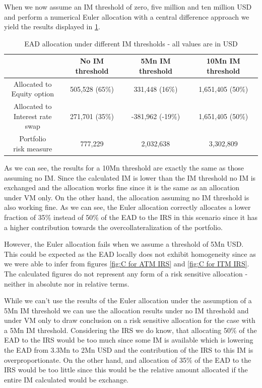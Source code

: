 \documentclass[../Thesis_AHoecherl.tex]{subfiles}
\begin{document}
    When we now assume an \gls{IM} threshold of zero, five million and ten million USD and perform a numerical Euler allocation with a central difference approach we yield the results displayed in \ref{tab:IM threshold example allocated}.
    \begin{table}[htbp]
        \centering
        \begin{tabular}{c||c|c|c}
            & No \gls{IM} threshold & 5Mn \gls{IM} threshold & 10Mn \gls{IM} threshold \\
            \toprule
            \makecell{Allocated to \\ Equity option} & 505,528 (65\%) & 331,448 (16\%) & 1,651,405 (50\%) \\
            \midrule
            \makecell{Allocated to \\ Interest rate swap}& 271,701 (35\%) & -381,962 (-19\%) & 1,651,405 (50\%) \\
            \bottomrule
            \makecell{Portfolio \\ risk measure} & 777,229 & 2,032,638 & 3,302,809 \\
        \end{tabular}%
        \caption[EAD allocation under different IM thresholds]{EAD allocation under different IM thresholds - all values are in USD}
        \label{tab:IM threshold example allocated}
    \end{table}
    As we can see, the results for a 10Mn threshold are exactly the same as those assuming no IM. Since the calculated \gls{IM} is lower than the \gls{IM} threshold no \gls{IM} is exchanged and the allocation works fine since it is the same as an allocation under \gls{VM} only.
    On the other hand, the allocation assuming no \gls{IM} threshold is also working fine. As we can see, the Euler allocation correctly allocates a lower fraction of 35\% instead of 50\% of the \gls{EAD} to the \gls{IRS} in this scenario since it has a higher contribution towards the overcollateralization of the portfolio.

    However, the Euler allocation fails when we assume a threshold of 5Mn USD. This could be expected as the \gls{EAD} locally does not exhibit homogeneity since as we were able to infer from figures \ref{fig:C for ATM IRS} and \ref{fig:C for ITM IRS}. The calculated figures do not represent any form of a risk sensitive allocation - neither in absolute nor in relative terms.

    While we can't use the results of the Euler allocation under the assumption of a 5Mn \gls{IM} threshold we can use the allocation results under no \gls{IM} threshold and under \gls{VM} only to draw conclusion on a risk sensitive allocation for the case with a 5Mn \gls{IM} threshold.
    Considering the \gls{IRS} we do know, that allocating 50\% of the \gls{EAD} to the \gls{IRS} would be too much since some \gls{IM} is available which is lowering the \gls{EAD} from 3.3Mn to 2Mn USD and the contribution of the \gls{IRS} to this \gls{IM} is overproportionate. On the other hand, and allocation of 35\% of the \gls{EAD} to the \gls{IRS} would be too little since this would be the relative amount allocated if the entire \gls{IM} calculated would be exchange.
    
\end{document}
